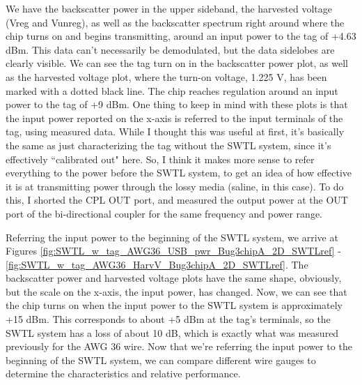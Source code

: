 \documentclass[12pt,onecolumn,titlepage]{article}
\begin{document}
We have the backscatter power in the upper sideband, the harvested voltage (Vreg and Vunreg), as well as the backscatter spectrum right around where the chip turns on and begins transmitting, around an input power to the tag of +4.63 dBm. This data can't necessarily be demodulated, but the data sidelobes are clearly visible. We can see the tag turn on in the backscatter power plot, as well as the harvested voltage plot, where the turn-on voltage, 1.225 V, has been marked with a dotted black line. The chip reaches regulation around an input power to the tag of +9 dBm. One thing to keep in mind with these plots is that the input power reported on the x-axis is referred to the input terminals of the tag, using measured data. While I thought this was useful at first, it's basically the same as just characterizing the tag without the SWTL system, since it's effectively ``calibrated out" here. So, I think it makes more sense to refer everything to the power before the SWTL system, to get an idea of how effective it is at transmitting power through the lossy media (saline, in this case). To do this, I shorted the CPL OUT port, and measured the output power at the OUT port of the bi-directional coupler for the same frequency and power range. 

Referring the input power to the beginning of the SWTL system, we arrive at Figures \ref{fig:SWTL_w_tag_AWG36_USB_pwr_Bug3chipA_2D_SWTLref} - \ref{fig:SWTL_w_tag_AWG36_HarvV_Bug3chipA_2D_SWTLref}. The backscatter power and harvested voltage plots have the same shape, obviously, but the scale on the x-axis, the input power, has changed. Now, we can see that the chip turns on when the input power to the SWTL system is approximately +15 dBm. This corresponds to about +5 dBm at the tag's terminals, so the SWTL system has a loss of about 10 dB, which is exactly what was measured previously for the AWG 36 wire. Now that we're referring the input power to the beginning of the SWTL system, we can compare different wire gauges to determine the characteristics and relative performance. 
\end{document}
